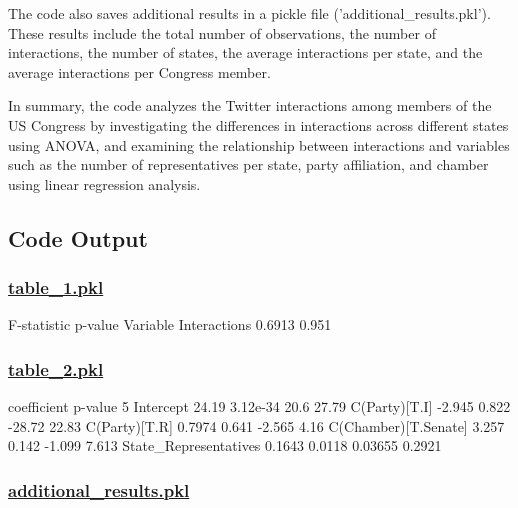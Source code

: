 \documentclass[11pt]{article}
\begin{document}
The code also saves additional results in a pickle file ('additional\_results.pkl'). These results include the total number of observations, the number of interactions, the number of states, the average interactions per state, and the average interactions per Congress member.

In summary, the code analyzes the Twitter interactions among members of the US Congress by investigating the differences in interactions across different states using ANOVA, and examining the relationship between interactions and variables such as the number of representatives per state, party affiliation, and chamber using linear regression analysis.

\subsection{Code Output}\hypertarget{file-table-1-pkl}{}

\subsubsection*{\hyperlink{code-Data Analysis-table-1-pkl}{table\_1.pkl}}

\begin{codeoutput}
              F-statistic p-value
Variable                         
Interactions       0.6913   0.951
\end{codeoutput}\hypertarget{file-table-2-pkl}{}

\subsubsection*{\hyperlink{code-Data Analysis-table-2-pkl}{table\_2.pkl}}

\begin{codeoutput}
                       coefficient   p-value  5%
Intercept                    24.19  3.12e-34                    20.6                    27.79
C(Party)[T.I]               -2.945     0.822                  -28.72                    22.83
C(Party)[T.R]               0.7974     0.641                  -2.565                     4.16
C(Chamber)[T.Senate]         3.257     0.142                  -1.099                    7.613
State_Representatives       0.1643    0.0118                 0.03655                   0.2921
\end{codeoutput}\hypertarget{file-additional-results-pkl}{}

\subsubsection*{\hyperlink{code-Data Analysis-additional-results-pkl}{additional\_results.pkl}}
\end{document}
